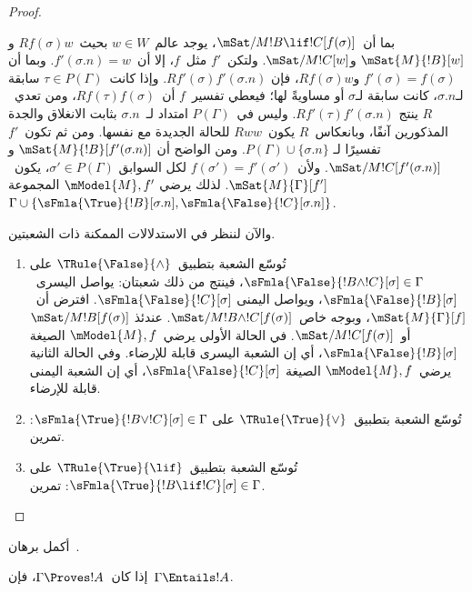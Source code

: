 \documentclass[../../../include/open-logic-section]{subfiles}
\begin{document}
\begin{proof}
\begin{enumerate}
  بما أن~$\mSat/{M}{!B \lif !C}[f(\sigma)]$، يوجد عالم~$w \in W$
  بحيث~$Rf(\sigma)w$ و$\mSat{M}{!B}[w]$ و$\mSat/{M}{!C}[w]$.
  ولتكن~$f'$ مثل~$f$، إلا أن~$f'(\sigma.n) = w$. وبما أن
  $f'(\sigma) = f(\sigma)$ و$Rf(\sigma)w$، فإن
  $Rf'(\sigma)f'(\sigma.n)$. وإذا كانت~$\tau\in P(\Gamma)$ سابقة
  لـ$\sigma.n$، كانت سابقة لـ$\sigma$ أو مساويةً لها؛ فيعطي تفسير~$f$
  أن~$Rf(\tau)f(\sigma)$، ومن تعدي~$R$ ينتج
  $Rf'(\tau)f'(\sigma.n)$. وليس في~$P(\Gamma)$ امتداد لـ~$\sigma.n$
  بثابت الانغلاق والجدة المذكورين آنفًا، وبانعكاس~$R$ يكون~$Rww$ للحالة
  الجديدة مع نفسها. ومن ثم تكون~$f'$ تفسيرًا لـ
  $P(\Gamma) \cup \{\sigma.n\}$. ومن الواضح أن
  $\mSat{M}{!B}[f'(\sigma.n)]$ و$\mSat/{M}{!C}[f'(\sigma.n)]$.
  ولأن~$f(\sigma') = f'(\sigma')$ لكل السوابق
  $\sigma' \in P(\Gamma)$، يكون~$\mSat{M}{\Gamma}[f']$. لذلك يرضي
  $\mModel{M}, f'$ المجموعة
  $\Gamma \cup \{\sFmla{\True}{!B}[\sigma.n],
  \sFmla{\False}{!C}[\sigma.n]\}$.
\end{enumerate}
والآن لننظر في الاستدلالات الممكنة ذات الشعبتين.
\begin{enumerate}
\item تُوسّع الشعبة بتطبيق~$\TRule{\False}{\land}$ على
  $\sFmla{\False}{!B \land !C}[\sigma] \in \Gamma$، فينتج من ذلك
  شعبتان: يواصل اليسرى~$\sFmla{\False}{!B}[\sigma]$، ويواصل اليمنى
  $\sFmla{\False}{!C}[\sigma]$. افترض أن~$\mSat{M}{\Gamma}[f]$،
  وبوجه خاص~$\mSat/{M}{!B \land !C}[f(\sigma)]$. عندئذ
  $\mSat/{M}{!B}[f(\sigma)]$ أو~$\mSat/{M}{!C}[f(\sigma)]$.
  في الحالة الأولى يرضي~$\mModel{M}, f$ الصيغة
  $\sFmla{\False}{!B}[\sigma]$، أي إن الشعبة اليسرى قابلة للإرضاء.
  وفي الحالة الثانية يرضي~$\mModel{M}, f$ الصيغة
  $\sFmla{\False}{!C}[\sigma]$، أي إن الشعبة اليمنى قابلة للإرضاء.
\item تُوسّع الشعبة بتطبيق~$\TRule{\True}{\lor}$ على
    $\sFmla{\True}{!B \lor !C}[\sigma] \in \Gamma$: تمرين.
\item تُوسّع الشعبة بتطبيق~$\TRule{\True}{\lif}$ على
    $\sFmla{\True}{!B \lif !C}[\sigma] \in \Gamma$: تمرين.
\end{enumerate}
\end{proof}

\begin{prob}
أكمل برهان~.
\end{prob}

\begin{cor}
إذا كان~$\Gamma \Proves !A$، فإن~$\Gamma \Entails !A$.
\end{cor}
\end{document}
